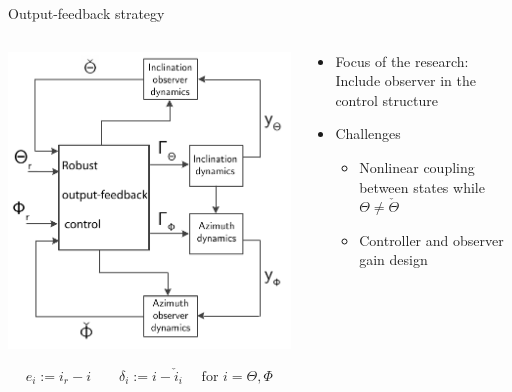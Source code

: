 \documentclass{beamer}
\begin{document}
\begin{frame}{Output-feedback strategy}
	\begin{columns}
		\hspace{1cm}\begin{column}{0.5\textwidth}
			\includegraphics[width=1.1\textwidth]{images/ControlStrategyRobust.pdf}
			
			\footnotesize \begin{equation*}
						e_i := i_{r} - i \qquad \delta_i := i - \check{i}_i \quad \text{ for } i=\Theta,\Phi
			\end{equation*}
		\end{column}
		\begin{column}{0.5\textwidth}
			\begin{itemize}\setlength\itemsep{2.5em}
				\item Focus of the research: Include observer in the control structure
				\item Challenges
					\begin{itemize}
						\item  Nonlinear coupling between states while $\Theta \ne \check{\Theta}$
						\item  Controller and observer gain design
					\end{itemize}
			\end{itemize}
		\end{column}
	\end{columns}
\end{frame}
\end{document}
